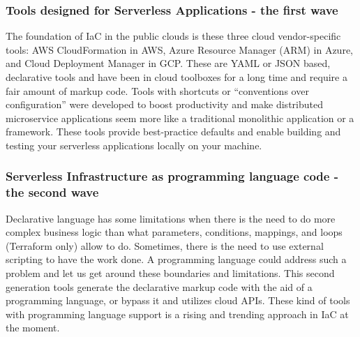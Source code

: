 \subsubsection{Tools designed for Serverless Applications - the first wave}
The foundation of IaC in the public clouds is these three cloud vendor-specific tools: AWS CloudFormation in \gls{AWS}, \gls{Azure Resource Manager} (ARM) in \gls{Azure}, and \gls{Cloud Deployment Manager} in \gls{GCP}.
These are YAML or JSON based, declarative tools and have been in cloud toolboxes for a long time and require a fair amount of markup code.
Tools with shortcuts or “conventions over configuration” were developed to boost productivity and make distributed microservice applications seem more like a traditional monolithic application or a framework.
These tools provide best-practice defaults and enable building and testing your serverless applications locally on your machine.
\subsubsection{Serverless Infrastructure as programming language code - the second wave}
\label{sssec:second-wave}
Declarative language has some limitations when there is the need to do more complex business logic than what parameters, conditions, mappings, and loops (Terraform only) allow to do.
Sometimes, there is the need to use external scripting to have the work done.
A programming language could address such a problem and let us get around these boundaries and limitations.
This second generation tools generate the declarative markup code with the aid of a programming language, or bypass it and utilizes cloud APIs.
These kind of tools with programming language support is a rising and trending approach in IaC at the moment.